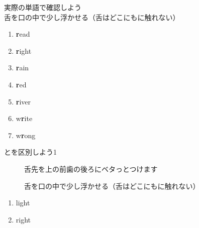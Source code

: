 \documentclass[aspectratio=169,xcolor={dvipsnames,table}]{beamer}
\begin{document}
\begin{frame}[plain]{実際の単語で確認しよう }
\hspace{20pt}舌を口の中で少し浮かせる（舌はどこにもに触れない）%
\hfill{\scriptsize {}}
\LARGE
\begin{enumerate}
 \item \textcolor{NavyBlue}{\bfseries r}ead%
\hfill{}\hspace{150pt}\mbox{}
 \item \textcolor{NavyBlue}{\bfseries r}ight
\hfill{}\hspace{150pt}\mbox{}
 \item \textcolor{NavyBlue}{\bfseries r}ain
\hfill{}\hspace{150pt}\mbox{}
 \item \textcolor{NavyBlue}{\bfseries r}ed
\hfill{}\hspace{150pt}\mbox{}
 \item \textcolor{NavyBlue}{\bfseries r}iver
\hfill{}\hspace{150pt}\mbox{}
\item w\textcolor{NavyBlue}{\bfseries r}ite
\hfill{}\hspace{150pt}\mbox{}
\item w\textcolor{NavyBlue}{\bfseries r}ong
\hfill{}\hspace{150pt}\mbox{}
\end{enumerate}
\end{frame}
\begin{frame}[plain]{とを区別しよう1}

\begin{description}
 \item[] 舌先を上の前歯の後ろにベタっとつけます
 \item[] 舌を口の中で少し浮かせる（舌はどこにもに触れない）
\end{description}

\Large 
 \begin{enumerate}
  \item light
  \item right

 \end{enumerate}

\hfill{}

\end{frame}
\end{document}
